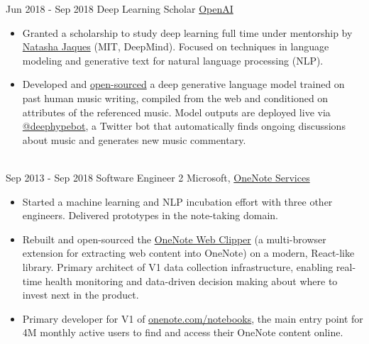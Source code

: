 \documentclass[letterpaper]{twentysecondcv} %
\begin{document}
\begin{twenty} %
    \twentyitem
    	{Jun 2018 -}
		{Sep 2018}
        {Deep Learning Scholar}
        {\href{https://blog.openai.com/openai-scholars/}{OpenAI}}
        {}
        {
        {\begin{itemize} \itemsep -2pt %
        \item Granted a scholarship to study deep learning full time under mentorship by \href{https://www.linkedin.com/in/natashajaques}{Natasha Jaques} (MIT, DeepMind). Focused on techniques in language modeling and generative text for natural language processing (NLP).
        \item Developed and \href{https://github.com/iconix/deephypebot}{open-sourced} a deep generative language model trained on past human music writing, compiled from the web and conditioned on attributes of the referenced music. Model outputs are deployed live via \href{https://twitter.com/deephypebot}{@deephypebot}, a Twitter bot that automatically finds ongoing discussions about music and generates new music commentary.
        \end{itemize}}
        }
    \\
    \twentyitem
    	{Sep 2013 -}
		{Sep 2018}
        {Software Engineer 2}
        {Microsoft, \href{http://www.onenote.com/}{OneNote Services}}
        {}
        {
        {\begin{itemize} \itemsep -2pt %
        \item Started a machine learning and NLP incubation effort with three other engineers. Delivered prototypes in the note-taking domain.
        \item Rebuilt and open-sourced the \href{https://github.com/OneNoteDev/WebClipper}{OneNote Web Clipper} (a multi-browser extension for extracting web content into OneNote) on a modern, React-like library. Primary architect of V1 data collection infrastructure, enabling real-time health monitoring and data-driven decision making about where to invest next in the product.
        \item Primary developer for V1 of \href{https://www.onenote.com/notebooks}{onenote.com/notebooks}, the main entry point for 4M monthly active users to find and access their OneNote content online.
        \end{itemize}}
        }

\end{twenty}
\end{document}

